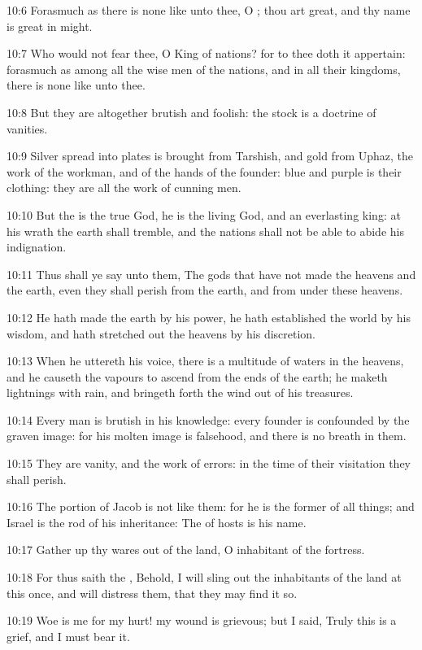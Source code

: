 10:6 Forasmuch as there is none like unto thee, O \LORD; thou art great, and thy name is great in might.

10:7 Who would not fear thee, O King of nations? for to thee doth it appertain: forasmuch as among all the wise men of the nations, and in all their kingdoms, there is none like unto thee.

10:8 But they are altogether brutish and foolish: the stock is a doctrine of vanities.

10:9 Silver spread into plates is brought from Tarshish, and gold from Uphaz, the work of the workman, and of the hands of the founder: blue and purple is their clothing: they are all the work of cunning men.

10:10 But the \LORD is the true God, he is the living God, and an everlasting king: at his wrath the earth shall tremble, and the nations shall not be able to abide his indignation.

10:11 Thus shall ye say unto them, The gods that have not made the heavens and the earth, even they shall perish from the earth, and from under these heavens.

10:12 He hath made the earth by his power, he hath established the world by his wisdom, and hath stretched out the heavens by his discretion.

10:13 When he uttereth his voice, there is a multitude of waters in the heavens, and he causeth the vapours to ascend from the ends of the earth; he maketh lightnings with rain, and bringeth forth the wind out of his treasures.

10:14 Every man is brutish in his knowledge: every founder is confounded by the graven image: for his molten image is falsehood, and there is no breath in them.

10:15 They are vanity, and the work of errors: in the time of their visitation they shall perish.

10:16 The portion of Jacob is not like them: for he is the former of all things; and Israel is the rod of his inheritance: The \LORD of hosts is his name.

10:17 Gather up thy wares out of the land, O inhabitant of the fortress.

10:18 For thus saith the \LORD, Behold, I will sling out the inhabitants of the land at this once, and will distress them, that they may find it so.

10:19 Woe is me for my hurt! my wound is grievous; but I said, Truly this is a grief, and I must bear it.

